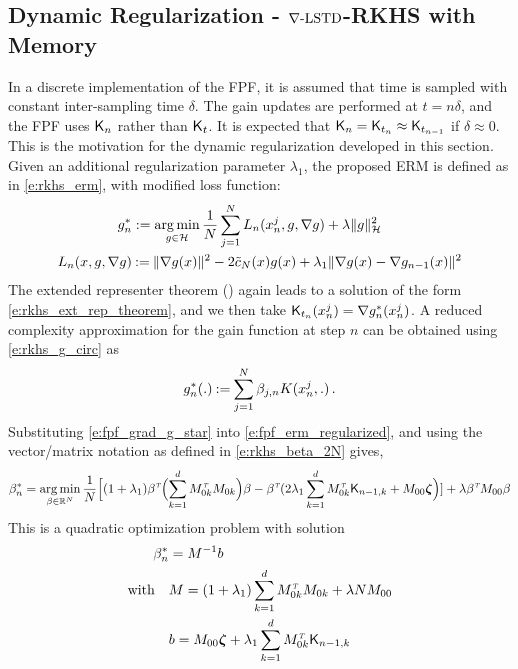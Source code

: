 \subsection{Dynamic Regularization - $\nabla\text{-LSTD}$-RKHS with Memory}
\label{s:fpf_rkhs_memory}
In a discrete implementation of the FPF, it is assumed that time is sampled with constant inter-sampling time $\delta$. The gain updates are performed at $t = n \delta$, and the FPF uses $\text{\sf K}_n$ rather than $\text{\sf K}_t$. It is expected that $\text{\sf K}_{n} = \text{\sf K}_{t_n}  \approx \text{\sf K}_{t_{n-1}}$ if $\delta\approx 0$.   This is the motivation for the dynamic regularization developed in this section.    Given an additional regularization parameter $\lambda_1$,  the proposed ERM is defined as in \eqref{e:rkhs_erm},  with modified loss function:
\begin{equation}
\begin{aligned}
g^*_n & := \argmin_{g \in \clH} \frac{1}{N} \sum_{j=1}^N  L_n(x_n^j,g,\nabla g) + \lambda \|g\|^2_\clH
\\
L_n(x,g,\nabla g) &  \eqdef  \| \nabla g(x) \|^2 - 2 \tilc_N(x)g(x)  + \lambda_1 \|\nabla g(x) -  \nabla g_{n-1}(x)\|^2
\end{aligned}
\label{e:fpf_erm_regularized}
\end{equation}
The extended representer theorem () again leads to a solution of the form \eqref{e:rkhs_ext_rep_theorem}, and we then take
$ \text{\sf K}_{t_n}(x^j_n) = \nabla g^*_n(x^j_n)$. A reduced complexity approximation for the gain function at step $n$ can be obtained using \eqref{e:rkhs_g_circ} as
\begin{equation}
g^*_n(.)  \eqdef \sum_{j=1}^N \beta_{j,n} \Kern(x^j_n, . ) \, .
\label{e:fpf_grad_g_star}
\end{equation}
Substituting \eqref{e:fpf_grad_g_star} into \eqref{e:fpf_erm_regularized}, and using the vector/matrix notation as defined in \eqref{e:rkhs_beta_2N} gives,
\begin{equation}
\beta ^*_n =
\mathop{\rm arg{\,}min}_{\beta  \in \mathbb{R}^N}  \frac{1}{N} \Bigl[ (1 + \lambda_1) \beta ^{\hbox{\tiny\it T}} \Bigl( \sum_{k=1}^d M_{0k}^{\hbox{\tiny\it T}} M_{0k} \Bigr) \beta  -  \beta ^{\hbox{\tiny\it T}}  ( 2 \lambda_1 \sum_{k=1}^d M_{0k}^{\hbox{\tiny\it T}} \text{\sf K}_{n-1,k} +M_{00} \boldsymbol{\zeta}  \Bigr) ] + \lambda \beta ^{\hbox{\tiny\it T}} M_{00} \beta
\end{equation}
This is a quadratic optimization problem with solution
\begin{equation}
\begin{aligned}
\beta ^*_n  &= M^{-1} b
\\
\text{with} \quad
&
M =  (1+ \lambda_1)\sum_{k=1}^d M_{0k}^\transpose M_{0k} + \lambda N M_{00}
\\
&b =  M_{00} \boldsymbol{\zeta}  + \lambda_1 \sum_{k =1}^d  M_{0k}^\transpose \kFPF_{n-1,k}
\end{aligned}
\label{e:fpf_beta_n}
\end{equation}

